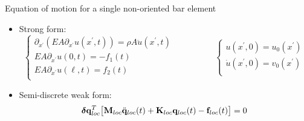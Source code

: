\documentclass[aspectratio=169]{beamer}
\begin{document}
\begin{frame}{Equation of motion for a single non-oriented bar element}
  \begin{itemize}
    \item Strong form:
          $$\begin{cases}
              \partial_{x^\prime}\left(EA \partial_{x^\prime}u(x^\prime, t)\right) = \rho A \ddot{u}(x^\prime, t) \\
              EA\partial_{x^\prime} u(0, t) = -f_{1}(t)                                                           \\
              EA\partial_{x^\prime} u(\ell, t) = f_{2}(t)                                                         \\
            \end{cases}\hspace{2cm}
            \begin{cases}
              u(x^\prime, 0) =  u_0(x^\prime)      \\
              \dot{u}(x^\prime, 0) = v_0(x^\prime) \\
            \end{cases}$$
    \item Semi-discrete weak form:
          \[\boldsymbol\delta\mathbf{q}_{loc}^T\big[\mathbf{M}_{loc} \ddot{\mathbf{q}}_{loc}(t) + \mathbf{K}_{loc} \mathbf{q}_{loc}(t) - \mathbf{f}_{loc}(t)\big]=0 \]
  \end{itemize}
\end{frame}
\end{document}
